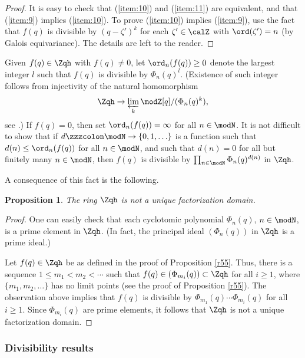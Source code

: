\documentclass{amsart}
\numberwithin{equation}{section}
\numberwithin{figure}{section}
\theoremstyle{plain}
\newtheorem{proposition}[theorem]{Proposition}
\theoremstyle{definition}
\theoremstyle{remark}
\begin{document}
\begin{proof}
  It is easy to check that (\ref{item:10}) and (\ref{item:11}) are
  equivalent, and that (\ref{item:9}) implies (\ref{item:10}).  To prove
  (\ref{item:10}) implies (\ref{item:9}), use the fact that $f(q)$ is
  divisible by $(q-\zeta ')^k$ for each $\zeta '\in \calZ$ with $\ord(\zeta ')=n$
  (by Galois equivariance).  The details are left to the reader.
\end{proof}

Given $f(q)\in \Zqh$ with $f(q)\neq0$, let $\ord_n(f(q))\ge 0$ denote the
largest integer $l$ such that $f(q)$ is divisible by $\Phi _n(q)^l$.
(Existence of such integer follows from injectivity of the natural
homomorphism
\begin{equation*}
  \Zqh\rightarrow \varprojlim_{k}\modZ [q]/(\Phi _n(q)^k),
\end{equation*}
see \cite[Corollary 4.1]{H:cyclotomic}.)  If $f(q)=0$, then set
$\ord_n(f(q))=\infty $ for all $n\in \modN $.  It is not difficult to show that
if $d\zzzcolon \modN \rightarrow \{0,1,\ldots \}$ is a function such that $d(n)\le \ord_n(f(q))$
for all $n\in \modN $, and such that $d(n)=0$ for all but finitely many
$n\in \modN $, then $f(q)$ is divisible by $\prod_{n\in \modN }\Phi _n(q)^{d(n)}$ in
$\Zqh$.

A consequence of this fact is the following.
\begin{proposition}
  \label{r57}
  The ring $\Zqh$ is {\em not} a unique factorization domain.
\end{proposition}

\begin{proof}
  One can easily check that each cyclotomic polynomial $\Phi _n(q)$,
  $n\in \modN $, is a prime element in $\Zqh$.  (In fact, the principal
  ideal $(\Phi _n(q))$ in $\Zqh$ is a prime ideal.)

  Let $f(q)\in \Zqh$ be as defined in the proof of Proposition
  \ref{r55}.  Thus, there is a sequence $1\le m_1<m_2<\cdots$ such that
  $f(q)\in (\Phi _{m_i}(q))\subset \Zqh$ for all $i\ge 1$, where $\{m_1,m_2,\ldots \}$
  has no limit points (see the proof of Proposition \ref{r55}).  The
  observation above implies that $f(q)$ is divisible by
  $\Phi _{m_1}(q)\cdots\Phi _{m_i}(q)$ for all $i\ge 1$.  Since $\Phi _{m_i}(q)$
  are prime elements, it follows that $\Zqh$ is not a unique
  factorization domain.
\end{proof}

\subsubsection{Divisibility results}
\label{sec:divisibility-results}
\end{document}
